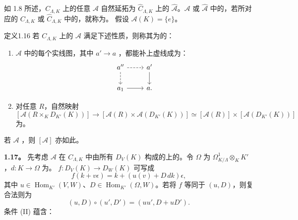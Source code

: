 如 1.8 所述，$C_{\Lambda,K}$ 上的任意 $\mathcal A$ 自然延拓为 $\widehat C_{\Lambda,K}$ 上的 $\widehat{\mathcal A}$。$\mathcal A$ 或 $\widehat{\mathcal A}$ 中的，若所对应的 $C_{\Lambda,K}$ 或 $\widehat C_{\Lambda,K}$ 中的，就称为。
假设 $\mathcal A(K)=\{e\}$。
\begin{SGAresult}{定义}{1.16}
若 $C_{\Lambda,K}$ 上的 $\mathcal A$ 满足下述性质，则称其为的：
\begin{enumerate}
\item[(I)] $\mathcal A$ 中的每个实线图，其中 $a'\to a$ ，都能补上虚线成为：
\[\begin{tikzcd}a''\arrow[r,dashed]\arrow[d,dashed]&a'\arrow[d]\\a_1\arrow[r]&a.\end{tikzcd}\]
\item[(II)] 对任意 $R$，自然映射
\[[\mathcal A(R\times_K D_{K'}(K))]\longrightarrow
[\mathcal A(R)\times\mathcal A(D_{K'}(K))]
\simeq[\mathcal A(R)]\times[\mathcal A(D_{K'}(K))]\]
为。
\end{enumerate}
若 $\mathcal A$ ，则 $[\mathcal A]$ 亦如此。
\end{SGAresult}
\textbf{1.17。} 先考虑 $\mathcal A$ 在 $C_{\Lambda,K}$ 中由所有 $D_V(K)$ 构成的上的。令 $\Omega$ 为 $\Omega^1_{K/\Lambda}\otimes_K K'$，$d:K\to\Omega$ 为。 $f:D_V(K)\to D_W(K)$ 可写成
\[f(k+v\epsilon)=k+(u(v)+D\,dk)\epsilon,\]
其中 $u\in\operatorname{Hom}_{K'}(V,W)$、$D\in\operatorname{Hom}_{K'}(\Omega,W)$。若将 $f$ 等同于 $(u,D)$，则复合法则为
\[(u,D)\circ(u',D')=(uu',D+uD').\]
条件 (II) 蕴含：

